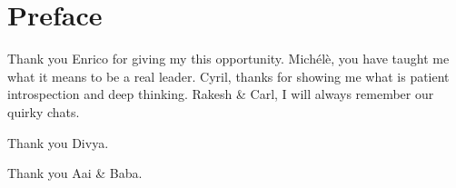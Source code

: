 \chapter*{Preface}\label{chapter:preface}


Thank you Enrico for giving my this opportunity. Mich\'el\`e, you have taught me what it 
means to be a real leader. Cyril, thanks for showing me what is patient introspection and 
deep thinking. Rakesh \& Carl, I will always remember our quirky chats.

Thank you Divya.

Thank you Aai \& Baba.
